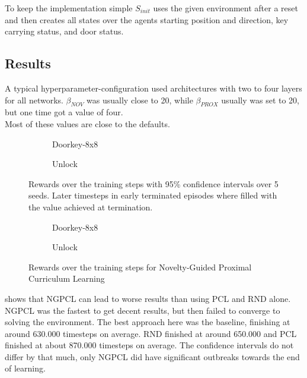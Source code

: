\documentclass{article}
\begin{document}
To keep the implementation simple $S_{init}$ uses the given environment after a reset and then creates all states over the agents starting position and direction, key carrying status, and door status.

\subsection{Results}
\label{sec:results}

A typical hyperparameter-configuration used architectures with two to four layers for all networks. $\beta_{NOV}$ was usually close to 20, while $\beta_{PROX}$ usually was set to 20, but one time got a value of four. \\
Most of these values are close to the defaults.

\begin{figure}[ht]
  \begin{subfigure}{0.49\textwidth}
    
    \caption{Doorkey-8x8}
    \label{fig:all:doorkey8}
  \end{subfigure}
  \begin{subfigure}{0.49\textwidth}
    
    \caption{Unlock}
    \label{fig:all:unlock}
  \end{subfigure}
  \caption{Rewards over the training steps with 95\% confidence intervals over 5 seeds. Later timesteps in early terminated episodes where filled with the value achieved at termination.}
  \label{fig:all}
\end{figure}

\begin{figure}[ht]
  \begin{subfigure}{0.49\textwidth}
    
    \caption{Doorkey-8x8}
    \label{fig:comb:doorkey8}
  \end{subfigure}
  \begin{subfigure}{0.49\textwidth}
    
    \caption{Unlock}
    \label{fig:comb:unlock}
  \end{subfigure}
  \caption{Rewards over the training steps for Novelty-Guided Proximal Curriculum Learning}
  \label{fig:comb}
\end{figure}

 shows that NGPCL can lead to worse results than using PCL and RND alone. NGPCL was the fastest to get decent results, but then failed to converge to solving the environment. The best approach here was the baseline, finishing at around 630.000 timesteps on average. RND finished at around 650.000 and PCL finished at about 870.000 timesteps on average. The confidence intervals do not differ by that much, only NGPCL did have significant outbreaks towards the end of learning.
\end{document}
